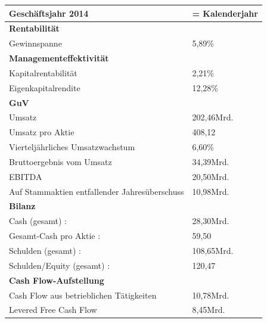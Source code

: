 \documentclass[12pt]{article}
\begin{document}
\newpage
\begin{table}
\begin{tabular}{|p{}|p{}|}
\hline
\textbf{Geschäftsjahr 2014}  & = Kalenderjahr \\  \hline
\textbf{Rentabilität}  & \\  \hline
 Gewinnspanne &   5,89\% \\ \hline
 \textbf{Managementeffektivität}  & \\  \hline
Kapitalrentabilität  & 2,21\%  \\  
Eigenkapitalrendite  &   12,28\%  \\  \hline
 \textbf{GuV}  & \\  \hline

 Umsatz &   202,46Mrd. \\  
 Umsatz pro Aktie &  408,12  \\  
 
Vierteljährliches Umsatzwachstum &   6,60\% \\  
 Bruttoergebnis vom Umsatz &34,39Mrd.    \\  
EBITDA  &  20,50Mrd.  \\  
 Auf Stammaktien entfallender Jahresüberschuss  &  10,98Mrd.  \\  \hline
  \textbf{Bilanz}  & \\  \hline


Cash (gesamt) : &  	28,30Mrd.  \\  

Gesamt-Cash pro Aktie : & 59,50   \\  
Schulden (gesamt) : &   108,65Mrd. \\  
 Schulden/Equity (gesamt) :&  	120,47  \\  \hline
   \textbf{Cash Flow-Aufstellung}  & \\  \hline

Cash Flow aus betrieblichen Tätigkeiten  &  10,78Mrd.  \\  
Levered Free Cash Flow  &  8,45Mrd.  \\  \hline

\end{tabular}
\end{table}
\cite{yahoofinanzenvw}

\newpage
\end{document}
